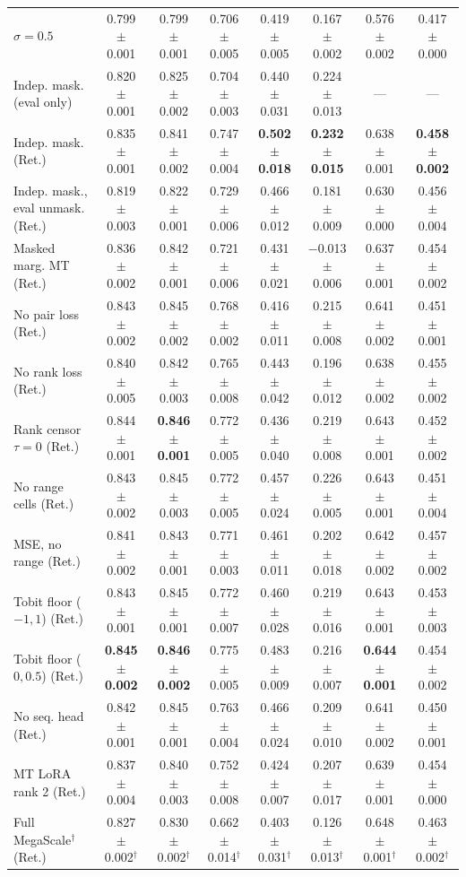 \begin{table}[H]
{\begin{tabular}{lccccccc}
$\sigma=0.5$ & 0.799 $\pm$ 0.001 & 0.799 $\pm$ 0.001 & 0.706 $\pm$ 0.005 & 0.419 $\pm$ 0.005 & 0.167 $\pm$ 0.002 & 0.576 $\pm$ 0.002 & 0.417 $\pm$ 0.000 \\
Indep. mask. (eval only) & 0.820 $\pm$ 0.001 & 0.825 $\pm$ 0.002 & 0.704 $\pm$ 0.003 & 0.440 $\pm$ 0.031 & 0.224 $\pm$ 0.013 & --- & --- \\
Indep. mask. (Ret.) & 0.835 $\pm$ 0.001 & 0.841 $\pm$ 0.002 & 0.747 $\pm$ 0.004 & \textbf{0.502 $\pm$ 0.018} & \textbf{0.232 $\pm$ 0.015} & 0.638 $\pm$ 0.001 & \textbf{0.458 $\pm$ 0.002} \\
Indep. mask., eval unmask. (Ret.) & 0.819 $\pm$ 0.003 & 0.822 $\pm$ 0.001 & 0.729 $\pm$ 0.006 & 0.466 $\pm$ 0.012 & 0.181 $\pm$ 0.009 & 0.630 $\pm$ 0.000 & 0.456 $\pm$ 0.004 \\
Masked marg. MT (Ret.) & 0.836 $\pm$ 0.002 & 0.842 $\pm$ 0.001 & 0.721 $\pm$ 0.006 & 0.431 $\pm$ 0.021 & $-$0.013 $\pm$ 0.006 & 0.637 $\pm$ 0.001 & 0.454 $\pm$ 0.002 \\
No pair loss (Ret.) & 0.843 $\pm$ 0.002 & 0.845 $\pm$ 0.002 & 0.768 $\pm$ 0.002 & 0.416 $\pm$ 0.011 & 0.215 $\pm$ 0.008 & 0.641 $\pm$ 0.002 & 0.451 $\pm$ 0.001 \\
No rank loss (Ret.) & 0.840 $\pm$ 0.005 & 0.842 $\pm$ 0.003 & 0.765 $\pm$ 0.008 & 0.443 $\pm$ 0.042 & 0.196 $\pm$ 0.012 & 0.638 $\pm$ 0.002 & 0.455 $\pm$ 0.002 \\
Rank censor $\tau=0$ (Ret.) & 0.844 $\pm$ 0.001 & \textbf{0.846 $\pm$ 0.001} & 0.772 $\pm$ 0.005 & 0.436 $\pm$ 0.040 & 0.219 $\pm$ 0.008 & 0.643 $\pm$ 0.001 & 0.452 $\pm$ 0.002 \\
No range cells (Ret.) & 0.843 $\pm$ 0.002 & 0.845 $\pm$ 0.003 & 0.772 $\pm$ 0.005 & 0.457 $\pm$ 0.024 & 0.226 $\pm$ 0.005 & 0.643 $\pm$ 0.001 & 0.451 $\pm$ 0.004 \\
MSE, no range (Ret.) & 0.841 $\pm$ 0.002 & 0.843 $\pm$ 0.001 & 0.771 $\pm$ 0.003 & 0.461 $\pm$ 0.011 & 0.202 $\pm$ 0.018 & 0.642 $\pm$ 0.002 & 0.457 $\pm$ 0.002 \\
Tobit floor ($-1, 1$) (Ret.) & 0.843 $\pm$ 0.001 & 0.845 $\pm$ 0.001 & 0.772 $\pm$ 0.007 & 0.460 $\pm$ 0.028 & 0.219 $\pm$ 0.016 & 0.643 $\pm$ 0.001 & 0.453 $\pm$ 0.003 \\
Tobit floor ($0, 0.5$) (Ret.) & \textbf{0.845 $\pm$ 0.002} & \textbf{0.846 $\pm$ 0.002} & 0.775 $\pm$ 0.005 & 0.483 $\pm$ 0.009 & 0.216 $\pm$ 0.007 & \textbf{0.644 $\pm$ 0.001} & 0.454 $\pm$ 0.002 \\
No seq. head (Ret.) & 0.842 $\pm$ 0.001 & 0.845 $\pm$ 0.001 & 0.763 $\pm$ 0.004 & 0.466 $\pm$ 0.024 & 0.209 $\pm$ 0.010 & 0.641 $\pm$ 0.002 & 0.450 $\pm$ 0.001 \\
MT LoRA rank 2 (Ret.) & 0.837 $\pm$ 0.004 & 0.840 $\pm$ 0.003 & 0.752 $\pm$ 0.008 & 0.424 $\pm$ 0.007 & 0.207 $\pm$ 0.017 & 0.639 $\pm$ 0.001 & 0.454 $\pm$ 0.000 \\
Full MegaScale$^\dagger$ (Ret.) & 0.827 $\pm$ 0.002$^\dagger$ & 0.830 $\pm$ 0.002$^\dagger$ & 0.662 $\pm$ 0.014$^\dagger$ & 0.403 $\pm$ 0.031$^\dagger$ & 0.126 $\pm$ 0.013$^\dagger$ & 0.648 $\pm$ 0.001$^\dagger$ & 0.463 $\pm$ 0.002$^\dagger$ \\
\bottomrule
\end{tabular}
}
\end{table}
